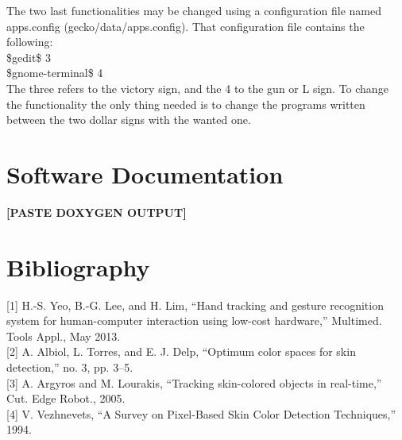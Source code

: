 \documentclass{article}
\begin{document}
The two last functionalities may be changed using a configuration file named apps.config (gecko/data/apps.config). 
That configuration file contains the following:
\\[0.5cm]
\$gedit\$ 3 \\
\$gnome-terminal\$ 4
\\[0.5cm]
The three refers to the victory sign, and the 4 to the gun or L sign. To change the functionality the only thing needed is to change the programs written between the two dollar signs with the wanted one. 

\newpage
\section{Software Documentation}
\textbf{[PASTE DOXYGEN OUTPUT]}

\newpage
\section{Bibliography}

[1] H.-S. Yeo, B.-G. Lee, and H. Lim, “Hand tracking and gesture recognition system for human-computer interaction using low-cost hardware,” Multimed. Tools Appl., May 2013.
\\[1cm]
[2] A. Albiol, L. Torres, and E. J. Delp, “Optimum color spaces for skin detection,” no. 3, pp. 3–5.
\\[1cm]
[3] A. Argyros and M. Lourakis, “Tracking skin-colored objects in real-time,” Cut. Edge Robot., 2005.
\\[1cm]
[4] V. Vezhnevets, “A Survey on Pixel-Based Skin Color Detection Techniques,” 1994.
\end{document}
